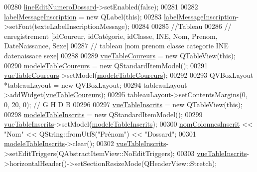 \begin{DoxyCode}
00280     \hyperlink{class_i_h_m_gestion_cross_adeb4cfc9a218c06fca5cabc280a611e2}{lineEditNumeroDossard}->setEnabled(\textcolor{keyword}{false});
00281 
00282     \hyperlink{class_i_h_m_gestion_cross_a1855bd63290c39c20660064b41710e8c}{labelMessageInscription} = \textcolor{keyword}{new} QLabel(\textcolor{keyword}{this});
00283     \hyperlink{class_i_h_m_gestion_cross_a1855bd63290c39c20660064b41710e8c}{labelMessageInscription}->setFont(texteLabelInscriptionMessage);
00284 
00285     \textcolor{comment}{//Tableau}
00286     \textcolor{comment}{// enregistrement [idCoureur, idCatégorie, idClasse, INE, Nom, Prenom, DateNaissance, Sexe]}
00287     \textcolor{comment}{// tableau [nom prenom classe categorie INE datenaissace sexe]}
00288 
00289     \hyperlink{class_i_h_m_gestion_cross_a4a0ba98c5b671a38d67942254d2329db}{vueTableCoureurs} = \textcolor{keyword}{new} QTableView(\textcolor{keyword}{this});
00290     \hyperlink{class_i_h_m_gestion_cross_ad9560c4804694dbbf969de5f6f56eb30}{modeleTableCoureurs} = \textcolor{keyword}{new} QStandardItemModel();
00291     \hyperlink{class_i_h_m_gestion_cross_a4a0ba98c5b671a38d67942254d2329db}{vueTableCoureurs}->setModel(\hyperlink{class_i_h_m_gestion_cross_ad9560c4804694dbbf969de5f6f56eb30}{modeleTableCoureurs});
00292 
00293     QVBoxLayout *tableauLayout = \textcolor{keyword}{new} QVBoxLayout;
00294     tableauLayout->addWidget(\hyperlink{class_i_h_m_gestion_cross_a4a0ba98c5b671a38d67942254d2329db}{vueTableCoureurs});
00295     tableauLayout->setContentsMargins(0, 0, 20, 0); \textcolor{comment}{// G H D B}
00296 
00297     \hyperlink{class_i_h_m_gestion_cross_a79b4e49cf8b22c9894d366e08b722c55}{vueTableInscrits} = \textcolor{keyword}{new} QTableView(\textcolor{keyword}{this});
00298     \hyperlink{class_i_h_m_gestion_cross_a19565551280115e642ceb9790c7317bc}{modeleTableInscrits} = \textcolor{keyword}{new} QStandardItemModel();
00299     \hyperlink{class_i_h_m_gestion_cross_a79b4e49cf8b22c9894d366e08b722c55}{vueTableInscrits}->setModel(\hyperlink{class_i_h_m_gestion_cross_a19565551280115e642ceb9790c7317bc}{modeleTableInscrits});
00300     \hyperlink{class_i_h_m_gestion_cross_a94c58ce12155f117e0515ce0fc6503bc}{nomColonnesInscrit} << \textcolor{stringliteral}{"Nom"} << QString::fromUtf8(\textcolor{stringliteral}{"Prénom"}) << \textcolor{stringliteral}{"Dossard"};
00301     \hyperlink{class_i_h_m_gestion_cross_a19565551280115e642ceb9790c7317bc}{modeleTableInscrits}->clear();
00302     \hyperlink{class_i_h_m_gestion_cross_a79b4e49cf8b22c9894d366e08b722c55}{vueTableInscrits}->setEditTriggers(QAbstractItemView::NoEditTriggers);
00303     \hyperlink{class_i_h_m_gestion_cross_a79b4e49cf8b22c9894d366e08b722c55}{vueTableInscrits}->horizontalHeader()->setSectionResizeMode(QHeaderView::Stretch);

\end{DoxyCode}
